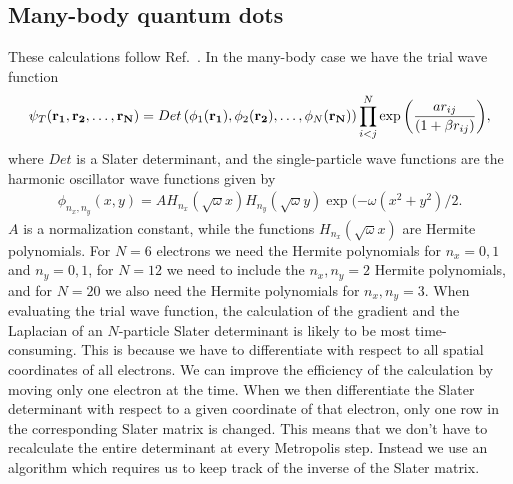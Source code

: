 \documentclass[../main.tex]{subfiles}
\begin{document}
\begin{appendices}
\section{Many-body quantum dots}\label{sec:ClosedFormMany}
These calculations follow Ref.~\cite{FYS4411-LectureNotes}.
In the many-body case we have the trial wave function 
\begin{align}
    \psi_{T}({\bf r_1},{\bf r_2},\dots, {\bf r_N}) = 
   Det\left(\phi_{1}({\bf r_1}),\phi_{2}({\bf r_2}),
   \dots,\phi_{N}({\bf r_N})\right)
   \prod_{i<j}^{N}\exp{\left(\frac{a r_{ij}}{(1+\beta r_{ij})}\right)}, 
\end{align}
where $Det$ is a Slater determinant, and the single-particle wave functions
are the harmonic oscillator wave functions given by
\begin{align}
    \phi_{n_x,n_y}(x,y) = A H_{n_x}(\sqrt{\omega}x)H_{n_y}(\sqrt{\omega}y)\exp{(-\omega(x^2+y^2)/2}.
\end{align}
$A$ is a normalization constant, while the functions $H_{n_x}(\sqrt{\omega}x)$ are Hermite polynomials. For $N=6$ electrons we need the Hermite polynomials for $n_x = 0,1$ and $n_y = 0,1$, for $N=12$ we need to include the $n_x,n_y = 2$ Hermite polynomials, and for $N=20$ we also need the Hermite polynomials for $n_x,n_y = 3$. When evaluating the trial wave function, the calculation of the gradient and the Laplacian of an $N$-particle Slater determinant is likely to be most time-consuming. This is because we have to differentiate with respect to all spatial coordinates of all electrons. We can improve the efficiency of the calculation by moving only one electron at the time. When we then differentiate the Slater determinant with respect to a given coordinate of that electron, only one row in the corresponding Slater matrix is changed. This means that we don't have to recalculate the entire determinant at every Metropolis step. Instead we use an algorithm which requires us to keep track of the inverse of the Slater matrix. 


\end{appendices}
\end{document}
